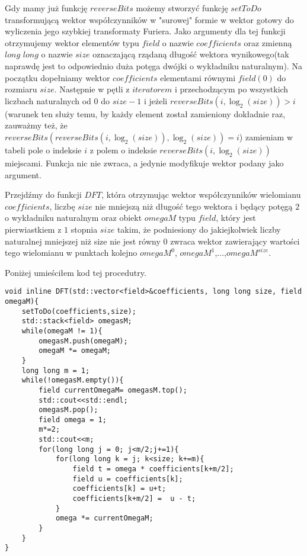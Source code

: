 \documentclass{article}
\begin{document}
Gdy mamy już funkcję $reverseBits$ możemy stworzyć funkcję $setToDo$ transformującą wektor współczynników w "surowej" formie w wektor gotowy
do wyliczenia jego szybkiej transformaty Furiera. Jako argumenty dla tej funkcji otrzymujemy wektor elementów typu $field$ o nazwie $coefficients$ oraz
zmienną $long$ $long$ o nazwie $size$ oznaczającą rządaną długość wektora wynikowego(tak naprawdę jest to odpowiednio duża potęga dwójki o wykładniku naturalnym). Na początku dopełniamy wektor $coefficients$ elementami równymi $field(0)$ do rozmiaru $size$. Następnie w pętli z $iteratorem$ i przechodzącym po wszystkich liczbach naturalnych od $0$ do $size-1$ i jeżeli $reverseBits(i,\log_2(size)) > i$(warunek ten służy temu, by każdy element został zamieniony dokładnie raz, zauważmy też, że $reverseBits( reverseBits (i ,\log_2(size)),\log_2(size))=i$) zamieniam w tabeli pole o indeksie $i$ z polem o indeksie 
$reverseBits (i ,\log_2(size))$ miejscami. Funkcja nic nie zwraca, a jedynie modyfikuje wektor podany jako argument.

Przejdźmy do funkcji $DFT$, która otrzymując wektor współczynników wielomianu $coefficients$, 
liczbę $size$ nie mniejszą niż długość tego wektora i będący potęgą $2$ o wykładniku naturalnym oraz obiekt $omegaM$ typu $field$,
który jest pierwiastkiem z $1$ stopnia $size$ takim, że podniesiony do jakiejkolwiek liczby naturalnej mniejszej niż size nie jest 
równy $0$ zwraca wektor zawierający wartości tego wielomianu w punktach kolejno $omegaM^0$, $omegaM^1$,...,$omegaM^{size}$. 

Poniżej umieściłem kod tej procedutry.

\begin{lstlisting}
void inline DFT(std::vector<field>&coefficients, long long size, field omegaM){
    setToDo(coefficients,size);
    std::stack<field> omegasM;
    while(omegaM != 1){
        omegasM.push(omegaM);
        omegaM *= omegaM;
    }
    long long m = 1;
    while(!omegasM.empty()){   
        field currentOmegaM= omegasM.top();
        std::cout<<std::endl;
        omegasM.pop();
        field omega = 1;
        m*=2;
        std::cout<<m;
        for(long long j = 0; j<m/2;j+=1){
            for(long long k = j; k<size; k+=m){
                field t = omega * coefficients[k+m/2];
                field u = coefficients[k];
                coefficients[k] = u+t;
                coefficients[k+m/2] =  u - t;
            }
            omega *= currentOmegaM;
        }
    }
}
\end{lstlisting}
\end{document}
